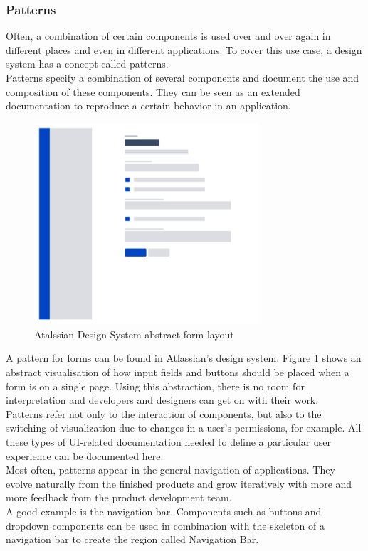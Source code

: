 \subsubsection{Patterns} \label{patterns}
Often, a combination of certain components is used over and over again in different places and even in different applications. To cover this use case, a design system has a concept called patterns.\\ 
Patterns specify a combination of several components and document the use and composition of these components. They can be seen as an extended documentation to reproduce a certain behavior in an application. 
\\
\begin{figure}[hbtp]
	\centerline{\includegraphics[height=7.5cm]{images/atlassian_abstract_form.png}}
	\caption{Atalssian Design System abstract form layout \cite{atlassian_design_system_atlassian_nodate}}
	\label{atlassian_form_layout}
\end{figure}
A pattern for forms can be found in Atlassian's design system. Figure \ref{atlassian_form_layout} shows an abstract visualisation of how input fields and buttons should be placed when a form is on a single page. Using this abstraction, there is no room for interpretation and developers and designers can get on with their work. \\
Patterns refer not only to the interaction of components, but also to the switching of visualization due to changes in a user's permissions, for example. All these types of UI-related documentation needed to define a particular user experience can be documented here.   \cite{vesselov_building_2019}
\\
Most often, patterns appear in the general navigation of applications. They evolve naturally from the finished products and grow iteratively with more and more feedback from the product development team.
\\
A good example is the navigation bar. Components such as buttons and dropdown components can be used in combination with the skeleton of a navigation bar to create the region called Navigation Bar. 
